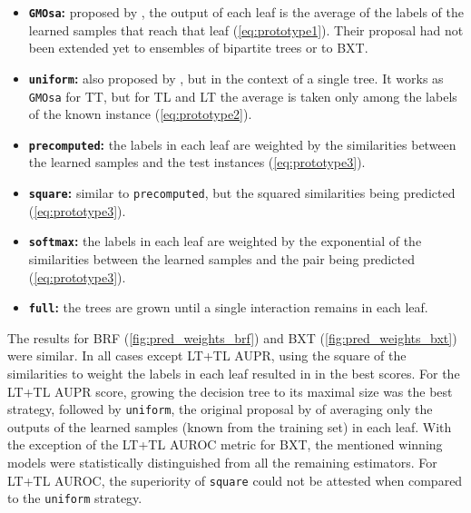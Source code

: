 \begin{itemize}
    \item \textbf{\texttt{GMOsa}:} proposed by , the output of each leaf is the average of the labels of the learned samples that reach that leaf (\autoref{eq:prototype1}). Their proposal had not been extended yet to ensembles of bipartite trees or to BXT.
    \item \textbf{\texttt{uniform}:} also proposed by , but in the context of a single tree. It works as \texttt{GMOsa} for TT, but for TL and LT the average is taken only among the labels of the known instance (\autoref{eq:prototype2}).
    \item \textbf{\texttt{precomputed}:}
    the labels in each leaf are weighted by the similarities between the learned samples and the test instances (\autoref{eq:prototype3}).
    \item \textbf{\texttt{square}:} similar to \texttt{precomputed}, but the squared similarities being predicted (\autoref{eq:prototype3}).
    \item \textbf{\texttt{softmax}:} the labels in each leaf are weighted by the exponential of the similarities between the learned samples and the pair being predicted (\autoref{eq:prototype3}).
    \item \textbf{\texttt{full}:} the trees are grown until a single interaction remains in each leaf. %
\end{itemize}


The results for BRF (\autoref{fig:pred_weights_brf}) and BXT (\autoref{fig:pred_weights_bxt}) were similar. In all cases except LT+TL AUPR, using the square of the similarities to weight the labels in each leaf resulted in in the best scores. For the LT+TL AUPR score, growing the decision tree to its maximal size was the best strategy, followed by \texttt{uniform}, the original proposal by  of averaging only the 
outputs of the learned samples (known from the training set) in each leaf. With the exception of the LT+TL AUROC metric for BXT, the mentioned winning models were statistically distinguished from all the remaining estimators. For LT+TL AUROC, the superiority of \texttt{square} could not be attested when compared to the \texttt{uniform} strategy.

